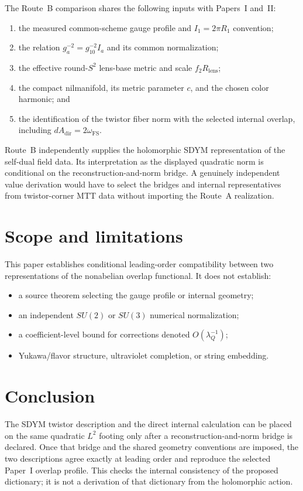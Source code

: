\documentclass[11pt]{article}
\begin{document}
The Route~B comparison shares the following inputs with Papers~I and~II:
\begin{enumerate}
\item the measured common-scheme gauge profile and $I_1=2\pi R_1$ convention;
\item the relation $g_a^{-2}=g_{10}^{-2}I_a$ and its common normalization;
\item the effective round-$S^2$ lens-base metric and scale
$f_2R_{\mathrm{lens}}$;
\item the compact nilmanifold, its metric parameter $c$, and the chosen color
harmonic; and
\item the identification of the twistor fiber norm with the selected internal
overlap, including $dA_{\mathrm{dir}}=2\omega_{\mathrm{FS}}$.
\end{enumerate}
Route~B independently supplies the holomorphic SDYM representation of the
self-dual field data. Its interpretation as the displayed quadratic norm is
conditional on the reconstruction-and-norm bridge. A genuinely independent value
derivation would have to select the bridges and internal representatives from
twistor-corner MTT data without importing the Route~A realization.

\section{Scope and limitations}

This paper establishes conditional leading-order compatibility between two
representations of the nonabelian overlap functional. It does not establish:
\begin{itemize}
\item a source theorem selecting the gauge profile or internal geometry;
\item an independent $SU(2)$ or $SU(3)$ numerical normalization;
\item a coefficient-level bound for corrections denoted
$O(\lambda_Q^{-1})$;
\item Yukawa/flavor structure, ultraviolet completion, or string embedding.
\end{itemize}

\section{Conclusion}

The SDYM twistor description and the direct internal calculation can be placed
on the same quadratic $L^2$ footing only after a reconstruction-and-norm
bridge is declared. Once that bridge and the shared geometry conventions are
imposed, the two descriptions agree exactly at leading order and reproduce the
selected Paper~I overlap profile. This checks the internal consistency of the
proposed dictionary; it is not a derivation of that dictionary from the
holomorphic action.
\end{document}
